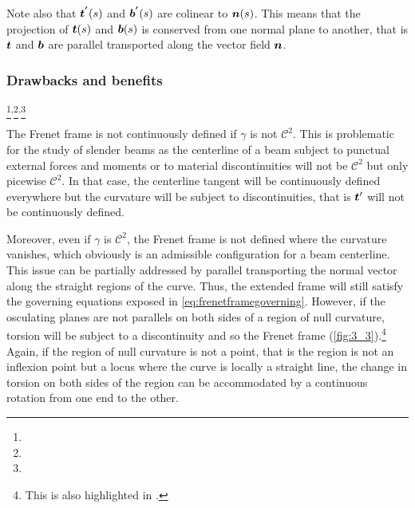 Note also that $\boldsymbol{t^{'}}(s)$ and $\boldsymbol{b^{'}}(s)$ are colinear to $\boldsymbol{n}(s)$. This means that the projection of $\boldsymbol{t}(s)$ and $\boldsymbol{b}(s)$ is conserved from one normal plane to another, that is $\boldsymbol{t}$ and $\boldsymbol{b}$ are parallel transported along the vector field $\boldsymbol{n}$.

\subsubsection{Drawbacks and benefits}\label{sec:frenetdrawbacks}
\footnote{}\textsuperscript{,}\footnote{}\textsuperscript{,}\footnote{}

The Frenet frame is not continuously defined if $\gamma$ is not $\mathcal{C}^2$. This is problematic for the study of slender beams as the centerline of a beam subject to punctual external forces and moments or to material discontinuities will not be $\mathcal{C}^2$ but only picewise $\mathcal{C}^2$. In that case, the centerline tangent will be continuously defined everywhere but the curvature will be subject to discontinuities, that is $\boldsymbol{t}'$ will not be continuously defined.

Moreover, even if $\gamma$ is $\mathcal{C}^2$, the Frenet frame is not defined where the curvature vanishes, which obviously is an admissible configuration for a beam centerline. This issue can be partially addressed by parallel transporting the normal vector along the straight regions of the curve. Thus, the extended frame will still satisfy the governing equations exposed in \cref{eq:frenetframegoverning}. However, if the osculating planes are not parallels on both sides of a region of null curvature, torsion will be subject to a discontinuity and so the Frenet frame (\cref{fig:3_3}).\footnote{This is also highlighted in \cite{Bloomenthal1990, Wang2008}.} Again, if the region of null curvature is not a point, that is the region is not an inflexion point but a locus where the curve is locally a straight line, the change in torsion on both sides of the region can be accommodated by a continuous rotation from one end to the other.

